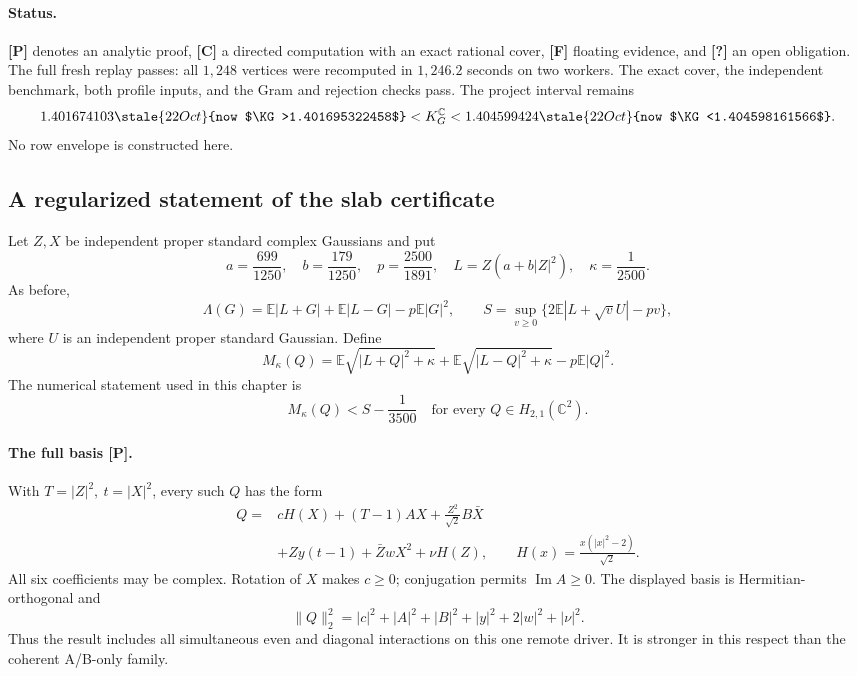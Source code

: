 \paragraph{Status.}
\textbf{[P]} denotes an analytic proof, \textbf{[C]} a directed
computation with an exact rational cover, \textbf{[F]} floating evidence,
and \textbf{[?]} an open obligation.
The full fresh replay passes: all $1{,}248$ vertices were recomputed in
$1{,}246.2$ seconds on two workers. The exact cover, the independent
benchmark, both profile inputs, and the Gram and rejection checks pass.
The project interval remains
\[
1.401674103\stale{22 Oct}{now $\KG>1.401695322458$}<K_G^{\mathbb C}<1.404599424\stale{22 Oct}{now $\KG<1.404598161566$}.
\]
No row envelope is constructed here.

\subsection{A regularized statement of the slab certificate}
Let \(Z,X\) be independent proper standard complex Gaussians and put
\[
a=\frac{699}{1250},\quad b=\frac{179}{1250},\quad
p=\frac{2500}{1891},\quad L=Z(a+b|Z|^2),\quad
\kappa=\frac1{2500}.
\]
As before,
\[
\Lambda(G)=\mathbb E|L+G|+\mathbb E|L-G|-p\mathbb E|G|^2,
\qquad
S=\sup_{v\ge0}\{2\mathbb E|L+\sqrt v U|-pv\},
\]
where \(U\) is an independent proper standard Gaussian.
Define
\[
M_\kappa(Q)=
\mathbb E\sqrt{|L+Q|^2+\kappa}
+\mathbb E\sqrt{|L-Q|^2+\kappa}
-p\mathbb E|Q|^2.
\]
The numerical statement used in this chapter is
\begin{equation}
\boxed{M_\kappa(Q)<S-\frac1{3500}
\quad\text{for every }Q\in H_{2,1}(\mathbb C^2).}
\label{eq:slab-regularized}
\end{equation}

\paragraph{The full basis [P].}
With \(T=|Z|^2,\ t=|X|^2\), every such \(Q\) has the form
\begin{align*}
Q={}&cH(X)+(T-1)AX+\frac{Z^2}{\sqrt2}B\bar X\\
&+Zy(t-1)+\bar Z wX^2+\nu H(Z),
\qquad H(x)=\frac{x(|x|^2-2)}{\sqrt2}.
\end{align*}
All six coefficients may be complex. Rotation of \(X\) makes \(c\ge0\);
conjugation permits \(\operatorname{Im}A\ge0\).
The displayed basis is Hermitian-orthogonal and
\[
\|Q\|_2^2=|c|^2+|A|^2+|B|^2+|y|^2+2|w|^2+|\nu|^2.
\]
Thus the result includes all simultaneous even and diagonal
interactions on this one remote driver. It is stronger in this respect
than the coherent A/B-only family.

